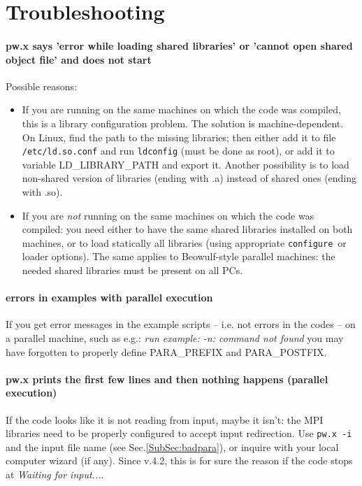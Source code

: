 \documentclass[12pt,a4paper]{article}
\def\configure{\texttt{configure}}
\begin{document}
\section{Troubleshooting}

\paragraph{pw.x says 'error while loading shared libraries' or
  'cannot open shared object file' and does not start} 
Possible reasons:
\begin{itemize}
\item If you are running on the same machines on which the code was
  compiled, this is a library configuration problem. The solution is
  machine-dependent. On Linux, find the path to the missing libraries;
  then either add it to file \texttt{/etc/ld.so.conf} and run \texttt{ldconfig}
   (must be
  done as root), or add it to variable LD\_LIBRARY\_PATH and export
  it. Another possibility is to load non-shared version of libraries
  (ending with .a)  instead of shared ones (ending with .so). 
\item If you are {\em not} running on the same machines on which the
  code was compiled: you need either to have the same shared libraries
  installed on both machines, or to load statically all libraries
  (using appropriate \configure\ or loader options). The same applies to
  Beowulf-style parallel machines: the needed shared libraries must be
  present on all PCs. 
\end{itemize}

\paragraph{errors in examples with parallel execution}

If you get error messages in the example scripts -- i.e. not errors in
the codes -- on a parallel machine, such as e.g.: 
{\em run example: -n: command not found}
you may have forgotten to properly define PARA\_PREFIX and PARA\_POSTFIX.

\paragraph{pw.x prints the first few lines and then nothing happens
  (parallel execution)} 
If the code looks like it is not reading from input, maybe
it isn't: the MPI libraries need to be properly configured to accept input
redirection. Use \texttt{pw.x -i} and the input file name (see
Sec.\ref{SubSec:badpara}), or inquire with
your local computer wizard (if any). Since v.4.2, this is for sure the
reason if the code stops at {\em Waiting for input...}.
\end{document}
